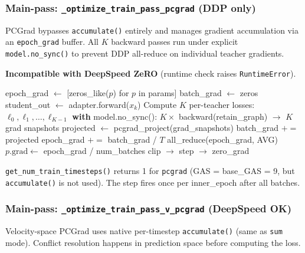 \documentclass[11pt]{article}
\begin{document}
\subsubsection{Main-pass: \texttt{\_optimize\_train\_pass\_pcgrad} (DDP only)}

PCGrad bypasses \texttt{accumulate()} entirely and manages gradient accumulation via an \texttt{epoch\_grad} buffer. All $K$ backward passes run under explicit \texttt{model.no\_sync()} to prevent DDP all-reduce on individual teacher gradients.

\textbf{Incompatible with DeepSpeed ZeRO} (runtime check raises \texttt{RuntimeError}).

\begin{algorithm}[H]
\caption{OPD Main-pass (PCGrad mode --- corrected)}
\begin{algorithmic}
\STATE epoch\_grad $\leftarrow$ [zeros\_like($p$) for $p$ in params] 
    \STATE batch\_grad $\leftarrow$ zeros
        \STATE student\_out $\leftarrow$ adapter.forward($x_k$) 
        \STATE Compute $K$ per-teacher losses: $\ell_0, \ell_1, \ldots, \ell_{K-1}$
        \STATE \textbf{with} model.no\_sync(): 
        \STATE \quad $K \times$ backward(retain\_graph) $\to$ $K$ grad snapshots
        \STATE projected $\leftarrow$ pcgrad\_project(grad\_snapshots)
        \STATE batch\_grad $\mathrel{+}=$ projected
    \ENDFOR
    \STATE epoch\_grad $\mathrel{+}=$ batch\_grad / $T$
\ENDFOR
\STATE all\_reduce(epoch\_grad, AVG) 
\STATE $p.\text{grad} \leftarrow$ epoch\_grad / num\_batches
\STATE clip $\to$ step $\to$ zero\_grad
\end{algorithmic}
\end{algorithm}

\texttt{get\_num\_train\_timesteps()} returns 1 for \texttt{pcgrad} (GAS = base\_GAS = 9, but \texttt{accumulate()} is not used). The step fires once per inner\_epoch after all batches.

\subsubsection{Main-pass: \texttt{\_optimize\_train\_pass\_v\_pcgrad} (DeepSpeed OK)}

Velocity-space PCGrad uses native per-timestep \texttt{accumulate()} (same as \texttt{sum} mode). Conflict resolution happens in prediction space before computing the loss.
\end{document}
